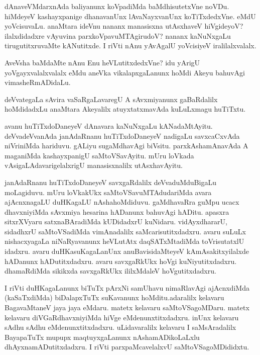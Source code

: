 \begin{mng}
dAnaveVMdarxnAda baliyanunx koVpadiMda baMdhisutetxVne noVDu. hiMdeyeV kashayxpanige dhanavanUnx lAvaNayxvanUnx koTiTxdedxVne. eMdU yoVcisuvaLu. anaMtara ideVnu nananx manasisxna utAsxhaveV hiVgideyoV? ilalxdidadxre vAyuvina parxkoVpavuMTAgirudoV? nananx kaNuNxgaLu tirugutitxruvaMte kANutitxde. I riVti nAnu yAvAgalU yoVcisiyeV iralilalxvalalx.
\end{mng}

\begin{mng}
AveVsha baMdaMte nAnu Enu heVLutitxdedxVne? idu yArigU yoVgayxvalalxvalalx eMdu aneVka vikalapxgaLanunx hoMdi Akeyu bahuvAgi vimasheRmADidaLu.
\end{mng}

\begin{mng}
deVvategaLa sAvira vaSaRgaLavaregU A sAvxmiyanunx gaBaRdalilx hoMdidadxLu anaMtara Akeyalilx atuyxtatxmavAda kuLuLxmagu huTiTxtu.
\end{mng}

\begin{mng}
avanu huTiTxdoDaneyeV dAnavara kaNuNxgaLu kANadaMtAyitu. deVvadeVvanAda janAdaRnanu huTiTxdoDaneyeV nadigaLu savxcaCxvAda niVriniMda hariduvu. gALiyu sugaMdhavAgi biVsitu. parxkAshamAnavAda A maganiMda kashayxpanigU saMtoVSavAyitu. mUru loVkada vAsigaLAdavarigelalxrigU manasisxnalilx utAsxhavAyitu.
\end{mng}

\begin{mng}
janAdaRnanu huTiTxdoDaneyeV savxgaRdalilx deVvaduMduBigaLu moLagiduvu. mUru loVkakUkx saMtoVSavuMTAdudariMda avara ajAcnxnagaLU duHKagaLU nAshahoMdiduvu. gaMdhavaRra guMpu ucacx dhavxniyiMda sAvxmiya hesarina hADanunx bahuvAgi hADitu. apasxra sitxrXVyaru satxnaBAradiMda kUDidadxrU kuNidaru. vidAyxdhararU, sidadhxrU saMtoVSadiMda vimAnadalilx saMcarisutitxdadxru. avaru suLuLx nishacxyagaLa niNaRyavanunx heVLutAtx daqSATxMtadiMda toVrisutatxlU idadxru. avaru duHKasuKagaLanUnx anuBavisidaMteyeV kAmAsakitxyilalxde hADanunx hADutitxdadxru. avaru savxgaRkUkx hoVgi kuNiyutitxdadxru. dhamaRdiMda sikikxda savxgaRkUkx ililxMdaleV hoVgutitxdadxru.
\end{mng}

\begin{mng}
I riVti duHKagaLanunx biTuTx pArxNi samUhavu nimaRlavAgi ajAcnxdiMda (kaSaTxdiMda) biDalapxTuTx suKavanunx hoMditu.adaralilx kelavaru BagavaMtaneV jaya jaya eMdaru. matetx kelavaru saMtoVSagoMDaru. matetx kelavaru diVGaRdhavxniyiMda hiVge eMdenunxtitxdadxru. inUnx kelavaru sAdhu sAdhu eMdenunxtitxdadxru. uLidavaralilx kelavaru I saMsAradalilx BayapaTuTx mupupx maqtuyxgaLanunx nAshamADikoLaLxlu dhAyxnamADutitxdadxru. I riVti parxpaMcavelalxvU saMtoVSagoMDididxtu.
\end{mng}


